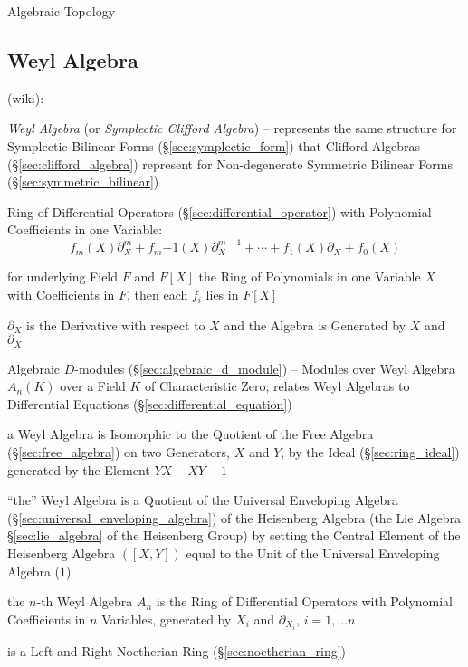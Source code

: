 Algebraic Topology



\subsection{Weyl Algebra}\label{sec:weyl_algebra}

(wiki):

\emph{Weyl Algebra} (or \emph{Symplectic Clifford Algebra}) -- represents the
same structure for Symplectic Bilinear Forms (\S\ref{sec:symplectic_form}) that
Clifford Algebras (\S\ref{sec:clifford_algebra}) represent for Non-degenerate
Symmetric Bilinear Forms (\S\ref{sec:symmetric_bilinear})

Ring of Differential Operators (\S\ref{sec:differential_operator}) with
Polynomial Coefficients in one Variable:
\[
  f_m(X)\partial^m_X + f_m{-1}(X)\partial^{m-1}_X + \cdots +
  f_1(X)\partial_X + f_0(X)
\]

for underlying Field $F$ and $F[X]$ the Ring of Polynomials in one Variable $X$
with Coefficients in $F$, then each $f_i$ lies in $F[X]$

$\partial_X$ is the Derivative with respect to $X$ and the Algebra is Generated
by $X$ and $\partial_X$

\fist Algebraic $D$-modules (\S\ref{sec:algebraic_d_module}) -- Modules over
Weyl Algebra $A_n(K)$ over a Field $K$ of Characteristic Zero; relates Weyl
Algebras to Differential Equations (\S\ref{sec:differential_equation})

a Weyl Algebra is Isomorphic to the Quotient of the Free Algebra
(\S\ref{sec:free_algebra}) on two Generators, $X$ and $Y$, by the Ideal
(\S\ref{sec:ring_ideal}) generated by the Element $YX - XY - 1$

``the'' Weyl Algebra is a Quotient of the Universal Enveloping Algebra
(\S\ref{sec:universal_enveloping_algebra}) of the Heisenberg Algebra (the Lie
Algebra \S\ref{sec:lie_algebra} of the Heisenberg Group) by setting the Central
Element of the Heisenberg Algebra $([X,Y])$ equal to the Unit of the Universal
Enveloping Algebra ($1$)

the $n$-th Weyl Algebra $A_n$ is the Ring of Differential Operators with
Polynomial Coefficients in $n$ Variables, generated by $X_i$ and
$\partial_{X_i}$, $i = 1, \ldots n$

is a Left and Right Noetherian Ring (\S\ref{sec:noetherian_ring})

